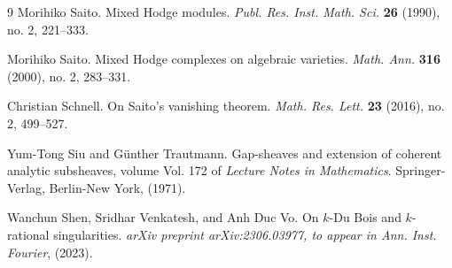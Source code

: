 \documentclass[11pt]{amsart}
\theoremstyle{definition}
\theoremstyle{plain}
\begin{document}
\begin{thebibliography}{9}
Morihiko Saito. Mixed Hodge modules. \emph{Publ. Res. Inst. Math. Sci.} {\bf 26} (1990), no. 2, 221--333.

Morihiko Saito. Mixed Hodge complexes on algebraic varieties. \emph{Math. Ann.} {\bf 316} (2000), no. 2, 283--331.

Christian Schnell. On Saito's vanishing theorem. \emph{Math. Res. Lett.} {\bf 23} (2016), no. 2, 499--527.

Yum-Tong Siu and G{\"u}nther Trautmann. Gap-sheaves and extension of coherent analytic subsheaves, volume Vol. 172 of \emph{Lecture Notes in Mathematics}. Springer-Verlag, Berlin-New York, (1971).

Wanchun Shen, Sridhar Venkatesh, and Anh Duc Vo. On $k$-Du Bois and $k$-rational singularities. \emph{arXiv preprint arXiv:2306.03977, to appear in Ann. Inst. Fourier}, (2023).


\end{thebibliography}
\end{document}

